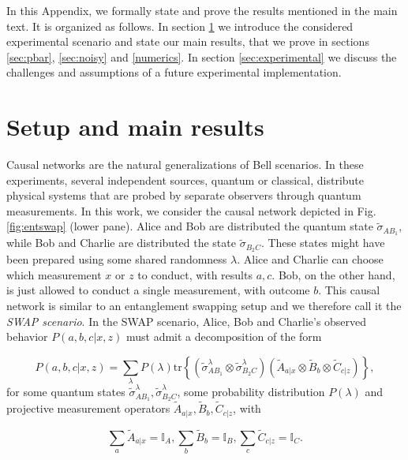 \documentclass[onecolumn,prx,amsmath,amssymb,12pt]{revtex4-2}
\def\be{\begin{equation}}
\def\ee{\end{equation}}
\def\id{{\mathbb I}}
\def\tr{\mbox{tr}}
\begin{document}
\begin{appendix}

In this Appendix, we formally state and prove the results mentioned in the main text. It is organized as follows. In section \ref{sec:setup} we introduce the considered experimental scenario and state our main results, that we prove in sections \ref{sec:pbar}, \ref{sec:noisy} and \ref{numerics}. In section \ref{sec:experimental} we discuss the challenges and assumptions of a future experimental implementation.

\section{Setup and main results} \label{sec:setup}

Causal networks are the natural generalizations of Bell scenarios. In these experiments, several independent sources, quantum or classical, distribute physical systems that are probed by separate observers through quantum measurements. In this work, we consider the causal network depicted in Fig. \ref{fig:entswap} (lower pane). Alice and Bob are distributed the quantum state $\tilde{\sigma}_{AB_1}$, while Bob and Charlie are distributed the state $\tilde{\sigma}_{B_2C}$. These states might have been prepared using some shared randomness $\lambda$. Alice and Charlie can choose which measurement $x$ or $z$ to conduct, with results $a, c$. Bob, on the other hand, is just allowed to conduct a single measurement, with outcome $b$. This causal network is similar to an entanglement swapping setup and we therefore call it the \emph{SWAP scenario}. In the SWAP scenario, Alice, Bob and Charlie's observed behavior $P(a,b,c|x,z)$ must admit a decomposition of the form

\be
P(a,b,c|x,z)=\sum_\lambda P(\lambda)\tr\left\{(\tilde{\sigma}^{\lambda}_{AB_1}\otimes\tilde{\sigma}^{\lambda}_{B_2C})(\tilde{A}_{a|x}\otimes \tilde{B}_{b}\otimes \tilde{C}_{c|z})\right\},
\label{decomp}
\ee
\noindent for some quantum states $\tilde{\sigma}_{AB_1}^\lambda,\tilde{\sigma}_{B_2C}^\lambda$, some probability distribution $P(\lambda)$ and projective measurement operators $\tilde{A}_{a|x},\tilde{B}_{b},\tilde{C}_{c|z}$, with 

\be
\sum_{a}\tilde{A}_{a|x}=\id_A, \sum_b \tilde{B}_b=\id_B, \sum_c \tilde{C}_{c|z}=\id_C.
\ee


\end{appendix}
\end{document}

